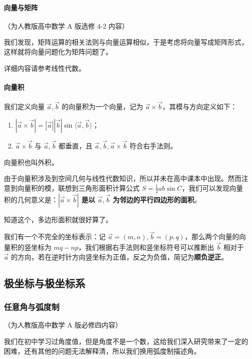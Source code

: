 \paragraph{向量与矩阵}

（为人教版高中数学 A 版选修 4-2 内容）

我们发现，矩阵运算的相关法则与向量运算相似，于是考虑将向量写成矩阵形式，这样就将向量问题化为矩阵问题了。

详细内容请参考线性代数。

\paragraph{向量积}

我们定义向量 $\vec a,\vec b$ 的向量积为一个向量，记为 $\vec a\times \vec b$，其模与方向定义如下：

\begin{enumerate}
\item $|\vec a\times \vec b|=|\vec a||\vec b|\sin \langle \vec a,\vec b\rangle$；
\item $\vec a\times \vec b$ 与 $\vec a,\vec b$ 都垂直，且 $\vec a,\vec b,\vec a\times \vec b$ 符合右手法则。
\end{enumerate}

向量积也叫外积。

由于向量积涉及到空间几何与线性代数知识，所以并未在高中课本中出现。然而注意到向量积的模，联想到三角形面积计算公式 $S=\frac{1}{2}ab\sin C$，我们可以发现向量积的几何意义是：\textbf{$|\vec a\times \vec b|$ 是以 $\vec a,\vec b$ 为邻边的平行四边形的面积}。

知道这个，多边形面积就很好算了。

我们有一个不完全的坐标表示：记 $\vec a=(m,n),\vec b=(p,q)$，那么两个向量的向量积的竖坐标为 $mq-np$，我们根据右手法则和竖坐标符号可以推断出 $\vec b$ 相对于 $\vec a$ 的方向，若在逆时针方向竖坐标为正值，反之为负值，简记为\textbf{顺负逆正}。

\subsection{极坐标与极坐标系}

\subsubsection{任意角与弧度制}

（为人教版高中数学 A 版必修四内容）

我们在初中学习过角度值，但是角度不是一个数，这给我们深入研究带来了一定的困难，还有其他的问题无法解释清，所以我们换用弧度制描述角。

